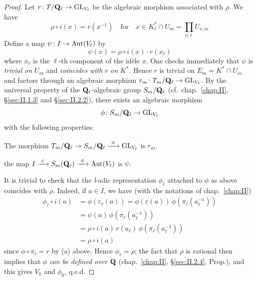\begin{proof}
Let $r\colon T/\mathbf{Q}_\ell\to\mathrm{GL}_{V_\ell}$ be the algebraic morphism
associated with $\rho$.  We have
\[
\rho\circ i(x) = r(x^{-1}) \quad\text{for}\quad
x\in K_\ell^*\cap U_m = \prod_{v|\ell}U_{v,m}
\]
Define a map $\psi\colon I\to\mathrm{Aut}(V_\ell)$ by
\[
\psi(x) = \rho\circ i(x)\cdot r(x_\ell)
\]
where $x_\ell$ is the $\ell$-th component of the idèle $x$.  One checks
immediately that $\psi$ is \emph{trivial on} $U_m$ and \emph{coincides
with} $r$ \emph{on} $K^*$.
Hence $r$ is trivial on $E_m = K^*\cap U_m$ and factors through an
algebraic morphism $r_m\colon T_m/\mathbf{Q}_\ell\to\mathrm{GL}_{V_\ell}$.  By the
universal property of the $\mathbf{Q}_\ell$-algebraic group $S_m/\mathbf{Q}_\ell$
(cf.~chap.~\ref{chap:II}, \S\ref{sec:II.1.3} and \S\ref{sec:II.2.2}),
there exists an algebraic morphism
\[
\phi\colon S_m/\mathbf{Q}_\ell \to \mathrm{GL}_{V_\ell}
\]
with the following properties:
\begin{alist}
\item The morphism
$T_m/\mathbf{Q}_\ell \to S_m/\mathbf{Q}_\ell \xrightarrow{\ \phi\ }\mathrm{GL}_{V_\ell}$
is $r_m$.
\item the map
$I \xrightarrow{\ \varepsilon\ } S_m(\mathbf{Q}_\ell)
\xrightarrow{\ \phi\ }\mathrm{Aut}(V_\ell)$ is $\psi$.
\end{alist}
It is trivial to check that the \textit{l}-adic representation
$\phi_\ell$ attached to $\phi$ as above coincides with $\rho$.  Indeed,
if $a\in I$, we have (with the notations of chap.~\ref{chap:II})
\begin{align*}
\phi_\ell\circ i(a) &= \phi(\varepsilon_\ell(a))
= \phi(\varepsilon(a))\,\phi(\pi_\ell(a_\ell^{-1}))\\
&= \psi(a)\,\phi(\pi_\ell(a_\ell^{-1}))\\
&= \rho\circ i(a)\,r(a_\ell)\,\phi(\pi_\ell(a_\ell^{-1}))\\
&= \rho\circ i(a)
\end{align*}
since $\phi\circ\pi_\ell = r$ by (a) above.  Hence $\phi_\ell=\rho$; the
fact that $\rho$ is rational then implies that $\phi$ \emph{can be
defined over} $\mathbf{Q}$ (chap.~\ref{chap:II}, \S\ref{sec:II.2.4}, Prop.), and
this gives $V_0$ and $\phi_0$, q.e.d.
\end{proof}

